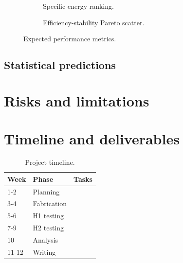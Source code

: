 \documentclass[11pt,a4paper]{article}
\theoremstyle{claim}
\begin{document}
\begin{figure}[H]
  \centering
  \begin{subfigure}[t]{0.48\linewidth}
    \caption{Specific energy ranking.}
    \label{fig:specific}
  \end{subfigure}
  \hfill
  \begin{subfigure}[t]{0.48\linewidth}
    \caption{Efficiency-stability Pareto scatter.}
    \label{fig:pareto}
  \end{subfigure}
  \caption{Expected performance metrics.}
  \label{fig:results}
\end{figure}

\subsection{Statistical predictions}

\section{Risks and limitations}

\section{Timeline and deliverables}

\begin{table}[H]
  \centering\small
  \caption{Project timeline.}
  \label{tab:timeline}
  \begin{tabularx}{\linewidth}{@{}l l X@{}}
    \toprule
    Week & Phase & Tasks \\
    \midrule
    1-2  & Planning      & \\
    3-4  & Fabrication   & \\
    5-6  & H1 testing    & \\
    7-9  & H2 testing    & \\
    10   & Analysis      & \\
    11-12& Writing       & \\
    \bottomrule
  \end{tabularx}
\end{table}
\end{document}
